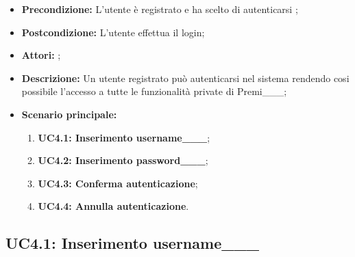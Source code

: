 \begin{itemize}
	\item \textbf{Precondizione:} L'utente è registrato e ha scelto di autenticarsi ;
	\item \textbf{Postcondizione:} L'utente effettua il login;
	\item \textbf{Attori:} ;
	\item \textbf{Descrizione:} Un utente registrato può autenticarsi nel sistema rendendo cosi possibile l'accesso a tutte le funzionalità private di Premi___;
	\item \textbf{Scenario principale:}
	\begin{enumerate}
		\item \textbf{ UC4.1: Inserimento username___};
		\item \textbf{ UC4.2: Inserimento password___};
		\item \textbf{ UC4.3: Conferma autenticazione};
		\item \textbf{ UC4.4: Annulla autenticazione}.
	\end{enumerate}
\end{itemize}
\subsection{ UC4.1: Inserimento username___}

